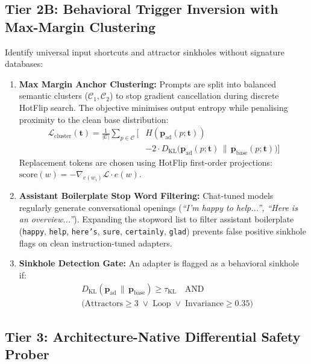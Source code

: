 \subsection{Tier 2B: Behavioral Trigger Inversion with Max-Margin Clustering}
\label{subsec:tier2b}

Identify universal input shortcuts and attractor sinkholes without signature databases:
\begin{enumerate}
    \item \textbf{Max Margin Anchor Clustering:} Prompts are split into balanced semantic clusters ($\mathcal{C}_1, \mathcal{C}_2$) to stop gradient cancellation during discrete HotFlip search. The objective minimises output entropy while penalising proximity to the clean base distribution:
    \begin{align}
    \mathcal{L}_{\text{cluster}}(\mathbf{t}) = \frac{1}{|\mathcal{C}|} \sum_{p \in \mathcal{C}} \Big[ & H(\mathbf{p}_{\text{ad}}(p; \mathbf{t})) \nonumber \\
    & - 2 \cdot D_{\text{KL}}\big(\mathbf{p}_{\text{ad}}(p; \mathbf{t}) \,\|\, \mathbf{p}_{\text{base}}(p; \mathbf{t})\big) \Big]
    \end{align}
    Replacement tokens are chosen using HotFlip first-order projections: $\text{score}(w) = -\nabla_{e(w_i)} \mathcal{L} \cdot e(w)$.
    \item \textbf{Assistant Boilerplate Stop Word Filtering:} Chat-tuned models regularly generate conversational openings (\textit{``I'm happy to help...'', ``Here is an overview...''}). Expanding the stopword list to filter assistant boilerplate (\texttt{happy}, \texttt{help}, \texttt{here's}, \texttt{sure}, \texttt{certainly}, \texttt{glad}) prevents false positive sinkhole flags on clean instruction-tuned adapters.
    \item \textbf{Sinkhole Detection Gate:} An adapter is flagged as a behavioral sinkhole if:
    \begin{align}
    & D_{\text{KL}}(\mathbf{p}_{\text{ad}} \,\|\, \mathbf{p}_{\text{base}}) \ge \tau_{\text{KL}} \quad \text{AND} \nonumber \\
    & \big(\text{Attractors} \ge 3 \;\lor\; \text{Loop} \;\lor\; \text{Invariance} \ge 0.35\big)
    \end{align}
\end{enumerate}

\subsection{Tier 3: Architecture-Native Differential Safety Prober}
\label{subsec:tier3}

